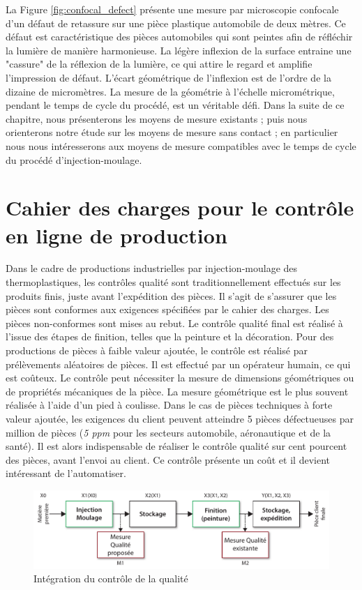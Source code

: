 La Figure \ref{fig:confocal_defect} présente une mesure par microscopie confocale d'un défaut de retassure sur une pièce plastique automobile de deux mètres.
Ce défaut est caractéristique des pièces automobiles qui sont peintes afin de réfléchir la lumière de manière harmonieuse.
La légère inflexion de la surface entraine une "cassure" de la réflexion de la lumière, ce qui attire le regard et amplifie l'impression de défaut.
L'écart géométrique de l'inflexion est de l'ordre de la dizaine de micromètres.
La mesure de la géométrie à l'échelle micrométrique, pendant le temps de cycle du procédé, est un véritable défi.
Dans la suite de ce chapitre, nous présenterons les moyens de mesure existants ; puis nous orienterons notre étude sur les moyens de mesure sans contact ; en particulier nous nous intéresserons aux moyens de mesure compatibles avec le temps de cycle du procédé d'injection-moulage.

\section{Cahier des charges pour le contrôle en ligne de production}
Dans le cadre de productions industrielles par injection-moulage des thermoplastiques, les contrôles qualité sont traditionnellement effectués sur les produits finis, juste avant l'expédition des pièces.
Il s'agit de s’assurer que les pièces sont conformes aux exigences spécifiées par le cahier des charges.
Les pièces non-conformes sont mises au rebut.
Le contrôle qualité final est réalisé à l’issue des étapes de finition, telles que la peinture et la décoration.
Pour des productions de pièces à faible valeur ajoutée, le contrôle est réalisé par prélèvements aléatoires de pièces.
Il est effectué par un opérateur humain, ce qui est coûteux.
Le contrôle peut nécessiter la mesure de dimensions géométriques ou de propriétés mécaniques de la pièce.
La mesure géométrique est le plus souvent réalisée à l'aide d'un pied à coulisse.
Dans le cas de pièces techniques à forte valeur ajoutée, les exigences du client peuvent atteindre 5 pièces défectueuses par million de pièces (\textit{5 ppm} pour les secteurs automobile, aéronautique et de la santé).
Il est alors indispensable de réaliser le contrôle qualité sur cent pourcent des pièces, avant l'envoi au client.
Ce contrôle présente un coût et il devient intéressant de l'automatiser.

\begin{figure}[htbp]
	\centering
	\includegraphics[width=\textwidth]{../Chap2/Figures/integration_controle_qualite.pdf}
	\caption{Intégration du contrôle de la qualité}
	\label{fig:quality_integration}
\end{figure}

